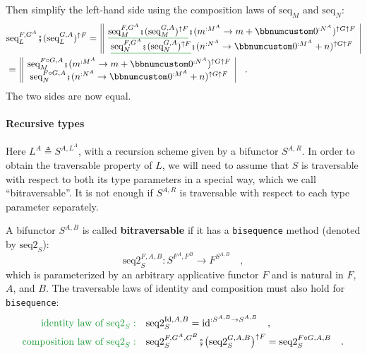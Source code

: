 Then simplify the left-hand side using the composition laws of $\text{seq}_{M}$
and $\text{seq}_{N}$:
\begin{align*}
 & \text{seq}_{L}^{F,G^{A}}\bef(\text{seq}_{L}^{G,A})^{\uparrow F}=\,\begin{array}{||c|}
\gunderline{\text{seq}_{M}^{F,G^{A}}\bef(\text{seq}_{M}^{G,A})^{\uparrow F}}\bef(m^{:M^{A}}\rightarrow m+\bbnum 0^{:N^{A}})^{\uparrow G\uparrow F}\\
\gunderline{\text{seq}_{N}^{F,G^{A}}\bef(\text{seq}_{N}^{G,A})^{\uparrow F}}\bef(n^{:N^{A}}\rightarrow\bbnum 0^{:M^{A}}+n)^{\uparrow G\uparrow F}
\end{array}\\
 & =\,\begin{array}{||c|}
\text{seq}_{M}^{F\circ G,A}\bef(m^{:M^{A}}\rightarrow m+\bbnum 0^{:N^{A}})^{\uparrow G\uparrow F}\\
\text{seq}_{N}^{F\circ G,A}\bef(n^{:N^{A}}\rightarrow\bbnum 0^{:M^{A}}+n)^{\uparrow G\uparrow F}
\end{array}\quad.
\end{align*}
The two sides are now equal.

\paragraph{Recursive types}

Here $L^{A}\triangleq S^{A,L^{A}}$, with a recursion scheme given
by a bifunctor $S^{A,R}$. In order to obtain the
traversable property of $L$, we will need to assume that $S$ is
traversable with respect to both its type parameters in a special
way, which we call \textsf{``}bitraversable\textsf{''}. It is not enough if $S^{A,R}$
is traversable with respect to each type parameter separately.

A bifunctor $S^{A,B}$ is called \textbf{bitraversable}
if it has a \lstinline!bisequence! method (denoted by $\text{seq2}_{S}$):
\[
\text{seq2}_{S}^{F,A,B}:S^{F^{A},F^{B}}\rightarrow F^{S^{A,B}}\quad,
\]
which is parameterized by an arbitrary applicative functor $F$ and
is natural in $F$, $A$, and $B$. The traversable laws of identity
and composition
must also hold for \lstinline!bisequence!:
\begin{align}
{\color{greenunder}\text{identity law of }\text{seq2}_{S}:}\quad & \text{seq2}_{S}^{\text{Id},A,B}=\text{id}^{:S^{A,B}\rightarrow S^{A,B}}\quad,\label{eq:identity-law-of-bisequence}\\
{\color{greenunder}\text{composition law of }\text{seq2}_{S}:}\quad & \text{seq2}_{S}^{F,G^{A},G^{B}}\bef\big(\text{seq2}_{S}^{G,A,B}\big)^{\uparrow F}=\text{seq2}_{S}^{F\circ G,A,B}\quad.\label{eq:composition-law-of-bisequence}
\end{align}

